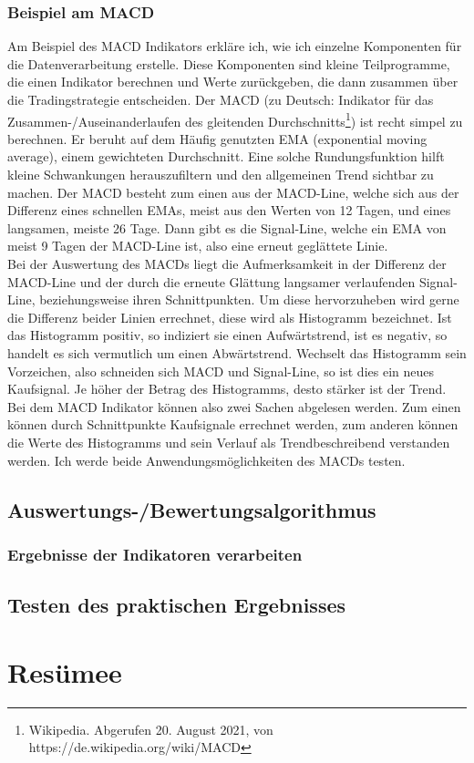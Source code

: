 \documentclass[12pt]{article}
\begin{document}
	\subsubsection{Beispiel am MACD}
		Am Beispiel des MACD Indikators erkläre ich, wie ich einzelne Komponenten für die Datenverarbeitung erstelle. Diese Komponenten sind kleine Teilprogramme, die einen Indikator berechnen und Werte zurückgeben, die dann zusammen über die Tradingstrategie entscheiden.
		Der MACD (zu Deutsch: Indikator für das Zusammen-/Auseinanderlaufen des gleitenden Durchschnitts\footnote{Wikipedia. Abgerufen 20. August 2021, von https://de.wikipedia.org/wiki/MACD}) ist recht simpel zu berechnen. Er beruht auf dem Häufig genutzten EMA (exponential moving average), einem gewichteten Durchschnitt. Eine solche Rundungsfunktion hilft kleine Schwankungen herauszufiltern und den allgemeinen Trend sichtbar zu machen. Der MACD besteht zum einen aus der MACD-Line, welche sich aus der Differenz eines schnellen EMAs, meist aus den Werten von 12 Tagen, und eines langsamen, meiste 26 Tage. Dann gibt es die Signal-Line, welche ein EMA von meist 9 Tagen der MACD-Line ist, also eine erneut geglättete Linie.\\
		Bei der Auswertung des MACDs liegt die Aufmerksamkeit in der Differenz der MACD-Line und der durch die erneute Glättung langsamer verlaufenden Signal-Line, beziehungsweise ihren Schnittpunkten. Um diese hervorzuheben wird gerne die Differenz beider Linien errechnet, diese wird als Histogramm bezeichnet. Ist das Histogramm positiv, so indiziert sie einen Aufwärtstrend, ist es negativ, so handelt es sich vermutlich um einen Abwärtstrend. Wechselt das Histogramm sein Vorzeichen, also schneiden sich MACD und Signal-Line, so ist dies ein neues Kaufsignal. Je höher der Betrag des Histogramms, desto stärker ist der Trend.\\
		Bei dem MACD Indikator können also zwei Sachen abgelesen werden. Zum einen können durch Schnittpunkte Kaufsignale errechnet werden, zum anderen können die Werte des Histogramms und sein Verlauf als Trendbeschreibend verstanden werden. Ich werde beide Anwendungsmöglichkeiten des MACDs testen.
\subsection{Auswertungs-/Bewertungsalgorithmus}
	\subsubsection{Ergebnisse der Indikatoren verarbeiten}
\subsection{Testen des praktischen Ergebnisses}
\section{Resümee}
\end{document}
